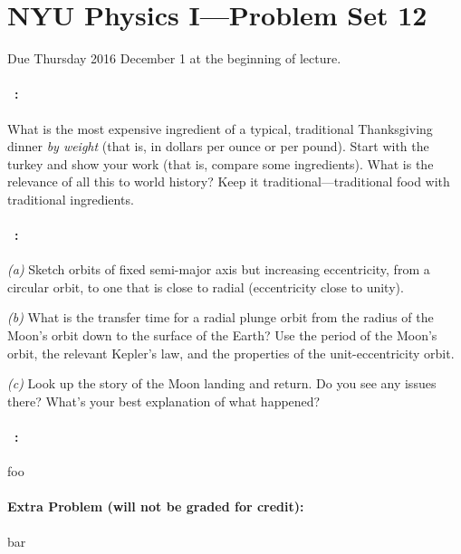 \documentclass[12pt]{article}
\begin{document}
\section*{NYU Physics I---Problem Set 12}

Due Thursday 2016 December 1 at the beginning of lecture.

\paragraph{\problemname~\theproblem:}%
What is the most expensive ingredient of a typical, traditional
Thanksgiving dinner \emph{by weight} (that is, in dollars per ounce or
per pound).  Start with the turkey and show your work (that is,
compare some ingredients). What is the relevance of all this to world
history? Keep it traditional---traditional food with traditional
ingredients.

\paragraph{\problemname~\theproblem:}%
\textsl{(a)} Sketch orbits of fixed semi-major axis but increasing
eccentricity, from a circular orbit, to one that is close to radial
(eccentricity close to unity).

\textsl{(b)} What is the transfer time for a radial plunge orbit
from the radius of the Moon's orbit down to the surface of the Earth?
Use the period of the Moon's orbit, the relevant  Kepler's law, and
the properties of the unit-eccentricity orbit.

\textsl{(c)} Look up the story of the Moon landing and return.
Do you see any issues there? What's your best explanation of what
happened?

\paragraph{\problemname~\theproblem:}%
foo

\paragraph{Extra Problem (will not be graded for credit):}%
bar
\end{document}
